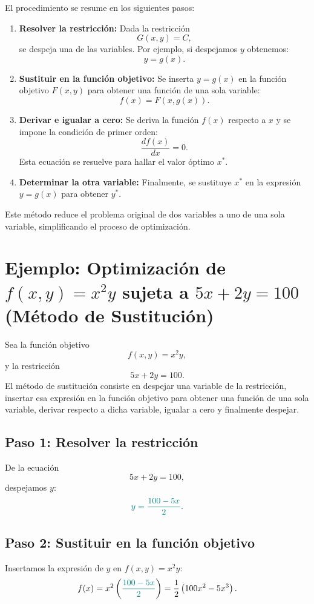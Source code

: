 \documentclass{article}
\begin{document}
El procedimiento se resume en los siguientes pasos:
\begin{enumerate}
    \item \textbf{\color{teal}Resolver la restricción:}  
    Dada la restricción
    \[
    G(x,y)=C,
    \]
    se despeja una de las variables. Por ejemplo, si despejamos \(y\) obtenemos:
    \[
    y = g(x).
    \]
    
    \item \textbf{\color{teal}Sustituir en la función objetivo:}  
    Se inserta \(y = g(x)\) en la función objetivo \(F(x,y)\) para obtener una función de una sola variable:
    \[
    f(x) = F(x, g(x)).
    \]
    
    \item \textbf{\color{teal}Derivar e igualar a cero:}  
    Se deriva la función \(f(x)\) respecto a \(x\) y se impone la condición de primer orden:
    \[
    \frac{df(x)}{dx} = 0.
    \]
    Esta ecuación se resuelve para hallar el valor óptimo \(x^*\).
    
    \item \textbf{\color{teal}Determinar la otra variable:}  
    Finalmente, se sustituye \(x^*\) en la expresión \(y = g(x)\) para obtener \(y^*\).
\end{enumerate}

Este método reduce el problema original de dos variables a uno de una sola variable, simplificando el proceso de optimización.



\section*{Ejemplo: Optimización de \(f(x,y)=x^2y\) sujeta a \(5x+2y=100\) (Método de Sustitución)}

Sea la función objetivo
\[
f(x,y)=x^2y,
\]
y la restricción
\[
5x+2y=100.
\]
El método de sustitución consiste en despejar una variable de la restricción, insertar esa expresión en la función objetivo para obtener una función de una sola variable, derivar respecto a dicha variable, igualar a cero y finalmente despejar.

\subsection*{Paso 1: Resolver la restricción}
De la ecuación
\[
5x+2y=100,
\]
despejamos \(y\):
\[\color{teal}
y=\frac{100-5x}{2}.
\]

\subsection*{Paso 2: Sustituir en la función objetivo}
Insertamos la expresión de \(y\) en \(f(x,y)=x^2y\):
\[
f(x)=x^2\left({\color{teal}\frac{100-5x}{2}}\right)=\frac{1}{2}\left(100x^2-5x^3\right).
\]
\end{document}
